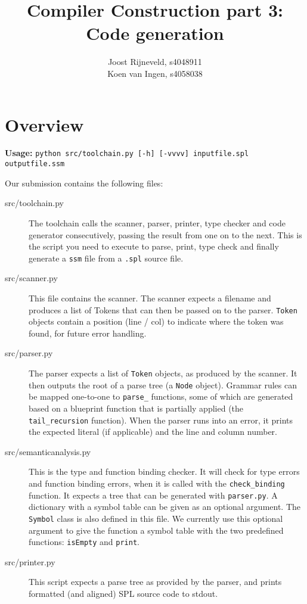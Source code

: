 \documentclass[a4paper]{article}
\title{Compiler Construction part 3: Code generation}
\author{Joost Rijneveld, s4048911\\Koen van Ingen, s4058038}
\date{}
\begin{document}
\maketitle

\section{Overview}
{\bf Usage:} {\tt python src/toolchain.py [-h] [-vvvv] inputfile.spl outputfile.ssm}

Our submission contains the following files:

\begin{description}
        \item[src/toolchain.py] The toolchain calls the scanner, parser, printer, type checker and code generator consecutively, passing the result from one on to the next. This is the script you need to execute to parse, print, type check and finally generate a {\tt ssm} file from a {\tt .spl} source file.
        \item[src/scanner.py] This file contains the scanner. The scanner expects a filename and produces a list of Tokens that can then be passed on to the parser. {\tt Token} objects contain a position (line / col) to indicate where the token was found, for future error handling.
        \item[src/parser.py] The parser expects a list of {\tt Token} objects, as produced by the scanner. It then outputs the root of a parse tree (a {\tt Node} object). Grammar rules can be mapped one-to-one to {\tt parse\_} functions, some of which are generated based on a blueprint function that is partially applied (the {\tt tail\_recursion} function). When the parser runs into an error, it prints the expected literal (if applicable) and the line and column number.
        \item[src/semanticanalysis.py] This is the type and function binding checker. It will check for type errors and function binding errors, when it is called with the {\tt check\_binding} function. It expects a tree that can be generated with {\tt parser.py}. A dictionary with a symbol table can be given as an optional argument. The {\tt Symbol} class is also defined in this file. We currently use this optional argument to give the function a symbol table with the two predefined functions: {\tt isEmpty} and {\tt print}. 
        \item[src/printer.py] This script expects a parse tree as provided by the parser, and prints formatted (and aligned) SPL source code to stdout.

\end{description}
\end{document}
